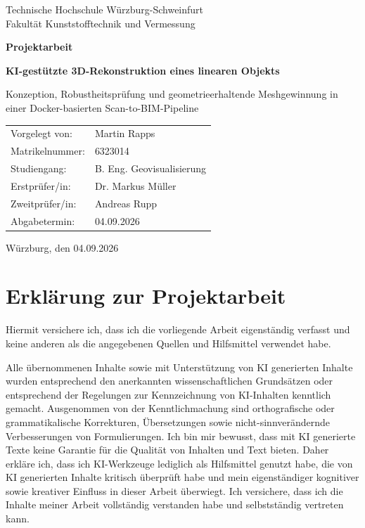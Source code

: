 \documentclass[12pt,a4paper]{article}
\newcommand{\thwsAuthor}{Martin Rapps}
\newcommand{\thwsMatriculation}{6323014}
\newcommand{\thwsDegree}{B. Eng. Geovisualisierung}
\newcommand{\thwsFirstExaminer}{Dr. Markus Müller}
\newcommand{\thwsSecondExaminer}{Andreas Rupp}
\newcommand{\thwsSubmissionDate}{04.09.2026}
\newif\ifanonym
\begin{document}
\thispagestyle{empty}
\begin{center}
	{\large Technische Hochschule Würzburg-Schweinfurt\\
	Fakultät Kunststofftechnik und Vermessung\par}
	\vfill
	{\LARGE\bfseries Projektarbeit\par}
	\vspace{1.2cm}
	{\Large\bfseries KI-gestützte 3D-Rekonstruktion eines linearen Objekts\par}
	\vspace{0.4cm}
	{\large Konzeption, Robustheitsprüfung und geometrieerhaltende
	Meshgewinnung in einer Docker-basierten Scan-to-BIM-Pipeline\par}
	\vfill
	\begin{tabular}{@{}ll@{}}
		\ifanonym Studiengang: & \thwsDegree\\
		\else Vorgelegt von: & \thwsAuthor\\
		Matrikelnummer: & \thwsMatriculation\\
		Studiengang: & \thwsDegree\\
		\fi
		Erstprüfer/in: & \thwsFirstExaminer\\
		Zweitprüfer/in: & \thwsSecondExaminer\\
		Abgabetermin: & \thwsSubmissionDate
	\end{tabular}
	\vfill
	Würzburg, den \thwsSubmissionDate
\end{center}
\clearpage

\section*{Erklärung zur Projektarbeit}
Hiermit versichere ich, dass ich die vorliegende Arbeit eigenständig verfasst
und keine anderen als die angegebenen Quellen und Hilfsmittel verwendet habe.

Alle übernommenen Inhalte sowie mit Unterstützung von KI generierten Inhalte
wurden entsprechend den anerkannten wissenschaftlichen Grundsätzen oder
entsprechend der Regelungen zur Kennzeichnung von KI-Inhalten kenntlich
gemacht. Ausgenommen von der Kenntlichmachung sind orthografische oder
grammatikalische Korrekturen, Übersetzungen sowie nicht-sinnverändernde
Verbesserungen von Formulierungen. Ich bin mir bewusst, dass mit KI generierte
Texte keine Garantie für die Qualität von Inhalten und Text bieten. Daher
erkläre ich, dass ich KI-Werkzeuge lediglich als Hilfsmittel genutzt habe, die
von KI generierten Inhalte kritisch überprüft habe und mein eigenständiger
kognitiver sowie kreativer Einfluss in dieser Arbeit überwiegt. Ich versichere,
dass ich die Inhalte meiner Arbeit vollständig verstanden habe und
selbstständig vertreten kann.
\end{document}
